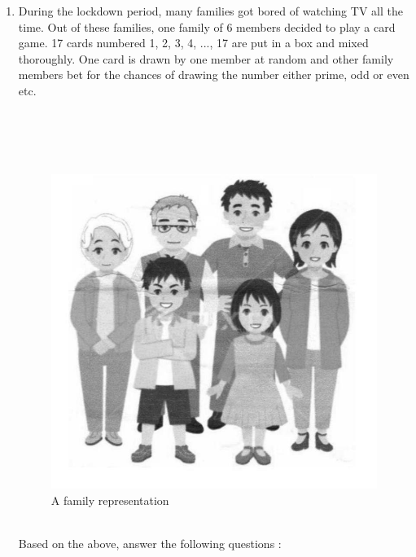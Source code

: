 \documentclass{article}
\begin{document}
	\begin{enumerate}

		\item During the lockdown period, many families got bored of watching TV all the time. Out of these families, one family of 6 members decided to play a card game. 17 cards numbered 1, 2, 3, 4, ..., 17 are put in a box and mixed thoroughly. One card is drawn by one member at random and other family members bet for the chances of drawing the number either prime, odd or even etc. 
		\\
		\\
		\\
		\\
		\\
        \begin{figure}[h!]
          \centering
          \includegraphics[width=\columnwidth]{figs/1.jpg}
          \caption{A family representation}
          \label{fig}
        \end{figure} 
        \\
		Based on the above, answer the following questions : 
		

\end{enumerate}
\end{document}
